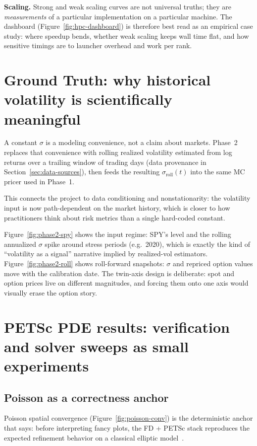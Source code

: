 \documentclass[11pt]{article}
\begin{document}
\textbf{Scaling.} Strong and weak scaling curves are not universal truths; they are
\emph{measurements} of a particular implementation on a particular machine. The
dashboard (Figure~\ref{fig:hpc-dashboard}) is therefore best read as an empirical
case study: where speedup bends, whether weak scaling keeps wall time flat, and
how sensitive timings are to launcher overhead and work per rank.

\section{Ground Truth: why historical volatility is scientifically meaningful}
A constant $\sigma$ is a modeling convenience, not a claim about markets. Phase~2
replaces that convenience with rolling realized volatility estimated from
log returns over a trailing window of trading days (data provenance in
Section~\ref{sec:data-sources}), then feeds the resulting
$\sigma_{\mathrm{roll}}(t)$ into the same MC pricer used in Phase~1.

This connects the project to data conditioning and nonstationarity:
the volatility input is now path-dependent on the market history, which is closer
to how practitioners think about risk metrics than a single hard-coded constant.

Figure~\ref{fig:phase2-spy} shows the input regime: SPY's level and the rolling
annualized $\sigma$ spike around stress periods (e.g.\ 2020), which is exactly the
kind of ``volatility as a signal'' narrative implied by realized-vol estimators.
Figure~\ref{fig:phase2-roll} shows roll-forward snapshots: $\sigma$ and repriced
option values move with the calibration date. The twin-axis design is deliberate:
spot and option prices live on different magnitudes, and forcing them onto one axis
would visually erase the option story.

\section{PETSc PDE results: verification and solver sweeps as small experiments}
\subsection{Poisson as a correctness anchor}
Poisson spatial convergence (Figure~\ref{fig:poisson-conv}) is the deterministic
anchor that says: before interpreting fancy plots, the FD + PETSc stack reproduces
the expected refinement behavior on a classical elliptic model~\cite{bueler2020petsc}.
\end{document}
